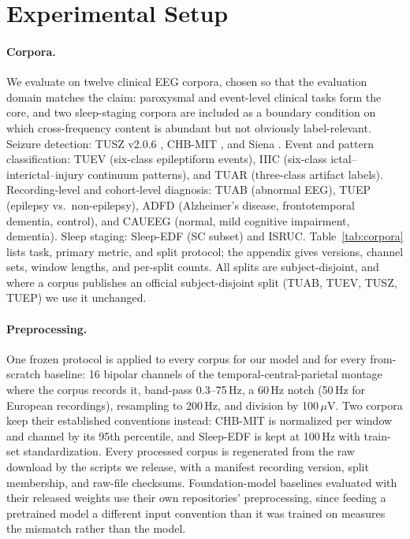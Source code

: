 \section{Experimental Setup}
\label{sec:setup}

\paragraph{Corpora.}
We evaluate on twelve clinical EEG corpora, chosen so that the evaluation
domain matches the claim: paroxysmal and event-level clinical tasks form the
core, and two sleep-staging corpora are included as a boundary condition on
which cross-frequency content is abundant but not obviously label-relevant.
Seizure detection: TUSZ v2.0.6 \citep{shah2018temple}, CHB-MIT
\citep{shoeb2009application}, and Siena \citep{detti2020eeg}. Event and pattern
classification: TUEV (six-class epileptiform events), IIIC (six-class ictal--
interictal--injury continuum patterns), and TUAR (three-class artifact
labels). Recording-level and cohort-level diagnosis: TUAB (abnormal EEG),
TUEP (epilepsy vs.\ non-epilepsy), ADFD (Alzheimer's disease, frontotemporal
dementia, control), and CAUEEG (normal, mild cognitive impairment,
dementia). Sleep staging: Sleep-EDF (SC subset) and ISRUC. Table~\ref{tab:corpora}
lists task, primary metric, and split protocol; the appendix gives versions,
channel sets, window lengths, and per-split counts. All splits are
subject-disjoint, and where a corpus publishes an official subject-disjoint
split (TUAB, TUEV, TUSZ, TUEP) we use it unchanged.

\paragraph{Preprocessing.}
One frozen protocol is applied to every corpus for our model and for every
from-scratch baseline: 16 bipolar channels of the temporal-central-parietal
montage where the corpus records it, band-pass 0.3--75\,Hz, a 60\,Hz notch
(50\,Hz for European recordings), resampling to 200\,Hz, and division by
100\,$\mu$V. Two corpora keep their established conventions instead:
CHB-MIT is normalized per window and channel by its 95th percentile, and
Sleep-EDF is kept at 100\,Hz with train-set standardization. Every processed
corpus is regenerated from the raw download by the scripts we release, with
a manifest recording version, split membership, and raw-file checksums.
Foundation-model baselines evaluated with their released weights use their
own repositories' preprocessing, since feeding a pretrained model a
different input convention than it was trained on measures the mismatch
rather than the model.

